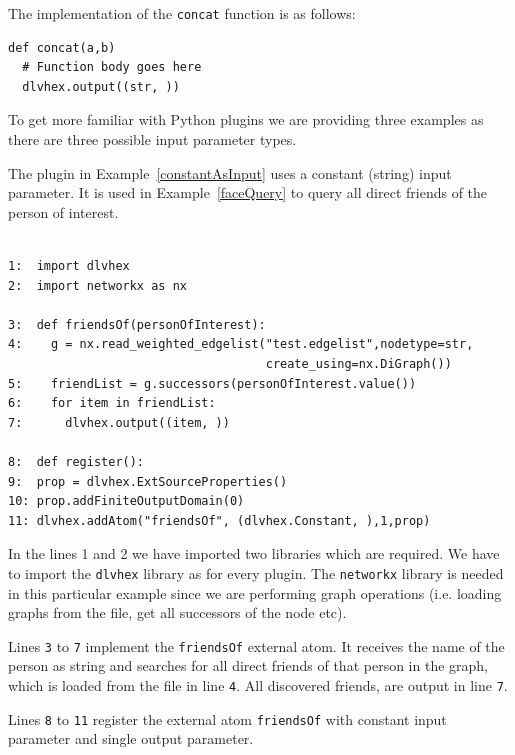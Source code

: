 \documentclass[a4paper, titlepage]{article}
\begin{document}
The implementation of the \verb+concat+ function is as follows:
\begin{verbatim}
def concat(a,b)
  # Function body goes here
  dlvhex.output((str, ))
\end{verbatim} 
To get more familiar with Python plugins we are providing three examples as there are three possible input parameter types.

The plugin in Example~\ref{constantAsInput} uses a constant (string) input parameter. It is used in Example~\ref{faceQuery} to query all direct friends of the person of interest.
\begin{exmp}
\label{constantAsInput}
\begin{verbatim}

1:  import dlvhex
2:  import networkx as nx

3:  def friendsOf(personOfInterest):
4:    g = nx.read_weighted_edgelist("test.edgelist",nodetype=str,
                                    create_using=nx.DiGraph())
5:    friendList = g.successors(personOfInterest.value())
6:    for item in friendList:
7:      dlvhex.output((item, ))

8:  def register():
9:  prop = dlvhex.ExtSourceProperties()
10: prop.addFiniteOutputDomain(0)
11: dlvhex.addAtom("friendsOf", (dlvhex.Constant, ),1,prop)
\end{verbatim}
\end{exmp}

In the lines 1 and 2 we have imported two libraries which 
are required. We have to import the \verb+dlvhex+ 
library as for every plugin. The \verb+networkx+ library is needed in this particular example since we are 
performing graph operations (i.e. loading graphs from the file, get all successors of the node etc). 

Lines \verb+3+ to \verb+7+ implement the \verb+friendsOf+ external atom. 
It receives the name of the person as string and searches for all 
direct friends of that person in the graph, which is loaded from the file in line \verb+4+. All discovered friends, are output in line \verb+7+. 

Lines \verb+8+ to \verb+11+ register the external atom 
\verb+friendsOf+ with constant input parameter and 
single output parameter. 
\end{document}
